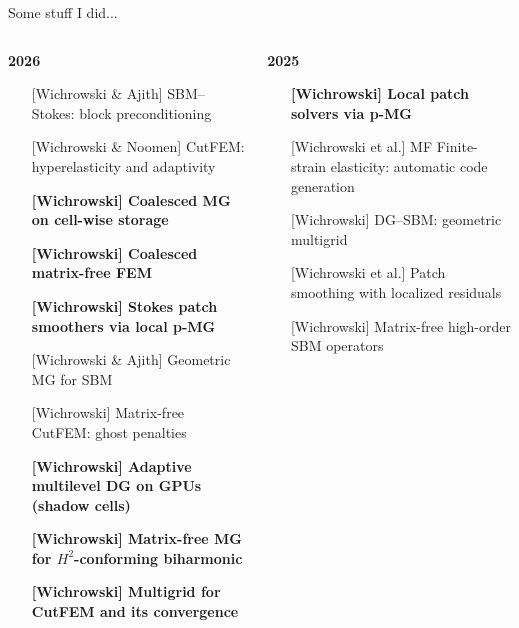 \documentclass{beamer}
\begin{document}
\begin{frame}{Some stuff I did...}
    \scriptsize
    \begin{columns}[T,onlytextwidth]
        \begin{column}{0.6\textwidth}
            {\centering\textbf{2026}\par}
            \begin{itemize}
                \setlength{\itemsep}{0.2em}
                \item[\textbullet] [Wichrowski \& Ajith] SBM--Stokes: block preconditioning
                \item[\textbullet] [Wichrowski \& Noomen] CutFEM: hyperelasticity and adaptivity
                \item[\textbullet] \textbf{[Wichrowski] Coalesced MG on cell-wise storage}
                \item[\textbullet] \textbf{[Wichrowski] Coalesced matrix-free FEM}
                \item[\textbullet] \textbf{[Wichrowski] Stokes patch smoothers via local p-MG}
                \item[\textbullet] [Wichrowski \& Ajith] Geometric MG for SBM
                \item[\textbullet] [Wichrowski] Matrix-free CutFEM: ghost penalties
                \item[\textbullet] \textbf{[Wichrowski] Adaptive multilevel DG on GPUs (shadow cells)}
                \item[\textbullet] \textbf{[Wichrowski] Matrix-free MG for $H^2$-conforming biharmonic}
                \item[\textbullet] \textbf{[Wichrowski] Multigrid for CutFEM and its convergence}
            \end{itemize}
        \end{column}
        \begin{column}{0.38\textwidth}
            {\centering\textbf{2025}\par}
            \begin{itemize}
                \setlength{\itemsep}{0.35em}
                \item[\textbullet] \textbf{[Wichrowski] Local patch solvers via p-MG}
                \item[\textbullet] [Wichrowski et al.] MF Finite-strain elasticity: automatic code generation
                \item[\textbullet] [Wichrowski] DG--SBM: geometric multigrid
                \item[\textbullet] [Wichrowski et al.] Patch smoothing with localized residuals
                \item[\textbullet] [Wichrowski] Matrix-free high-order SBM operators
            \end{itemize}
        \end{column}
    \end{columns}
\end{frame}
\end{document}
